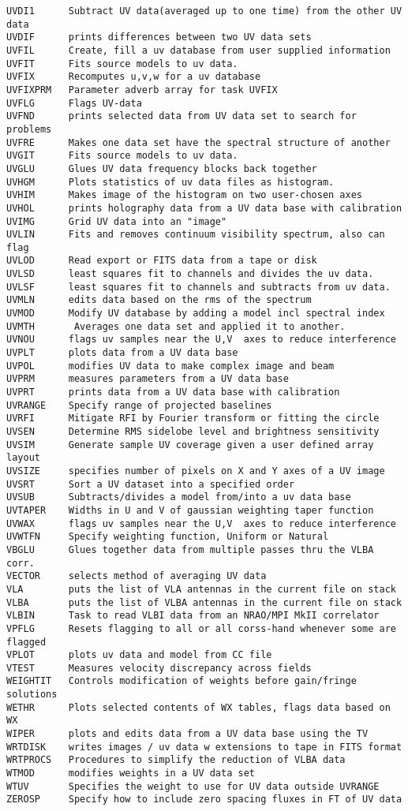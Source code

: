 \begin{verbatim}
UVDI1      Subtract UV data(averaged up to one time) from the other UV data
UVDIF      prints differences between two UV data sets
UVFIL      Create, fill a uv database from user supplied information
UVFIT      Fits source models to uv data.
UVFIX      Recomputes u,v,w for a uv database
UVFIXPRM   Parameter adverb array for task UVFIX
UVFLG      Flags UV-data
UVFND      prints selected data from UV data set to search for problems
UVFRE      Makes one data set have the spectral structure of another
UVGIT      Fits source models to uv data.
UVGLU      Glues UV data frequency blocks back together
UVHGM      Plots statistics of uv data files as histogram.
UVHIM      Makes image of the histogram on two user-chosen axes
UVHOL      prints holography data from a UV data base with calibration
UVIMG      Grid UV data into an "image"
UVLIN      Fits and removes continuum visibility spectrum, also can flag
UVLOD      Read export or FITS data from a tape or disk
UVLSD      least squares fit to channels and divides the uv data.
UVLSF      least squares fit to channels and subtracts from uv data.
UVMLN      edits data based on the rms of the spectrum
UVMOD      Modify UV database by adding a model incl spectral index
UVMTH       Averages one data set and applied it to another.
UVNOU      flags uv samples near the U,V  axes to reduce interference
UVPLT      plots data from a UV data base
UVPOL      modifies UV data to make complex image and beam
UVPRM      measures parameters from a UV data base
UVPRT      prints data from a UV data base with calibration
UVRANGE    Specify range of projected baselines
UVRFI      Mitigate RFI by Fourier transform or fitting the circle
UVSEN      Determine RMS sidelobe level and brightness sensitivity
UVSIM      Generate sample UV coverage given a user defined array layout
UVSIZE     specifies number of pixels on X and Y axes of a UV image
UVSRT      Sort a UV dataset into a specified order
UVSUB      Subtracts/divides a model from/into a uv data base
UVTAPER    Widths in U and V of gaussian weighting taper function
UVWAX      flags uv samples near the U,V  axes to reduce interference
UVWTFN     Specify weighting function, Uniform or Natural
VBGLU      Glues together data from multiple passes thru the VLBA corr.
VECTOR     selects method of averaging UV data
VLA        puts the list of VLA antennas in the current file on stack
VLBA       puts the list of VLBA antennas in the current file on stack
VLBIN      Task to read VLBI data from an NRAO/MPI MkII correlator
VPFLG      Resets flagging to all or all corss-hand whenever some are flagged
VPLOT      plots uv data and model from CC file
VTEST      Measures velocity discrepancy across fields
WEIGHTIT   Controls modification of weights before gain/fringe solutions
WETHR      Plots selected contents of WX tables, flags data based on WX
WIPER      plots and edits data from a UV data base using the TV
WRTDISK    writes images / uv data w extensions to tape in FITS format
WRTPROCS   Procedures to simplify the reduction of VLBA data
WTMOD      modifies weights in a UV data set
WTUV       Specifies the weight to use for UV data outside UVRANGE
ZEROSP     Specify how to include zero spacing fluxes in FT of UV data
\end{verbatim}\eve

